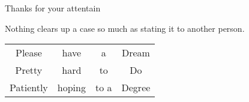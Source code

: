\par
\bigskip

\centerline{\huge Thanks for your attentain~}

\par
\bigskip
\centerline{Nothing clears up a case so much as stating it to another person.}
\par
\bigskip
\begin{center}
\begin{tabular}{c c c c} %
{\color{red}P}lease & {\color{red}h}ave & a & {\color{red}D}ream\\
{\color{red}P}retty & {\color{red}h}ard   & to & {\color{red}D}o \\
{\color{red}P}atiently & {\color{red}h}oping  & to a & {\color{red}D}egree\\ 
\end{tabular}
\end{center}



